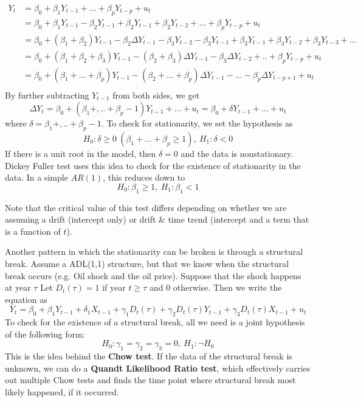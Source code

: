 \documentclass[12pt]{article}
\theoremstyle{definition}
\theoremstyle{property}
\theoremstyle{assumption}
\theoremstyle{example}
\theoremstyle{comment}
\begin{document}
\[
\begin{aligned}
 Y_t&=\beta_0 + \beta_1 Y_{t-1}+ ...+\beta_pY_{t-p}+u_t\\
 &=\beta_0 + \beta_1Y_{t-1}-\beta_2 Y_{t-1}+\beta_2Y_{t-1}+\beta_2 Y_{t-2}+...+\beta_pY_{t-p}+u_t\\
 &=\beta_0 + (\beta_1+\beta_2)Y_{t-1} -\beta_2 \Delta Y_{t-1} - \beta_3Y_{t-2}-\beta_3Y_{t-1}+\beta_3Y_{t-1}+\beta_3Y_{t-2}+\beta_3Y_{t-3}+...\\
 &=\beta_0 + (\beta_1+\beta_2+\beta_3)Y_{t-1}-(\beta_2+\beta_3)\Delta Y_{t-1} - \beta_3\Delta Y_{t-2}+ .. +\beta_pY_{t-p}+u_t
  \\
 &=\beta_0 + (\beta_1+...+\beta_p)Y_{t-1}-(\beta_2+...+\beta_p)\Delta Y_{t-1} - ... - \beta_{p}\Delta Y_{t-p+1}+u_t \\
 \end{aligned}
\]
By further subtracting $Y_{t-1}$ from both sides, we get
\[
\Delta Y_{t} = \beta_0 + (\beta_1 + ,.. +\beta_p-1) Y_{t-1}+ ... +u_t = \beta_0 + \delta Y_{t-1}+ ... +u_t 
\]
where $\delta = \beta_1 + ,.. +\beta_p-1$. To check for stationarity, we set the hypothesis as 
\[
H_0: \delta\geq0 \ (\beta_1+...+\beta_p\geq 1),\ H_1 : \delta<0 
\]
If there is a unit root in the model, then $\delta=0$ and the data is nonstationary. Dickey Fuller test uses this idea to check for the existence of stationarity in the data. In a simple $AR(1)$, this reduces down to
\[
H_0: \beta_1\geq 1,\ H_1 : \beta_1<1 
\]
\par\medskip
Note that the critical value of this test differs depending on whether we are assuming a drift (intercept only) or drift \& time trend (intercept and a term that is a function of $t$).
\par\medskip
Another pattern in which the stationarity can be broken is through a structural break. Assume a ADL(1,1) structure, but that we know when the structural break occurs (e.g. Oil shock and the oil price). Suppose that the shock happens at year $\tau$ Let $D_t(\tau)=1$ if year $t\geq\tau$ and 0 otherwise. Then we write the equation as
\[
Y_t = \beta_0 +\beta_1Y_{t-1}+\delta_1 X_{t-1} + \gamma_1 D_t(\tau)+\gamma_2 D_t(\tau)Y_{t-1}+\gamma_3 D_t(\tau)X_{t-1}+u_t
\]
To check for the existence of a structural break, all we need is a joint hypothesis of the following form:
\[
H_0: \gamma_1 = \gamma_2 = \gamma_3 =0, \ H_1: \lnot H_0
\]
This is the idea behind the \textbf{Chow test}. If the data of the structural break is unknown, we can do a \textbf{Quandt Likelihood Ratio test}, which effectively carries out multiple Chow tests and finds the time point where structural break most likely happened, if it occurred.  
\end{document}
